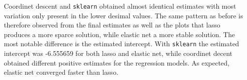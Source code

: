 \documentclass[11pt]{article}
\makeatletter
\newcommand{\boxspacing}{\kern\kvtcb@left@rule\kern\kvtcb@boxsep}
\newcommand{\prompt}[4]{
        {\ttfamily\llap{{\color{#2}[#3]:\hspace{3pt}#4}}\vspace{-\baselineskip}}
    }
\makeatother
\begin{document}
    Coordinet descent and \texttt{sklearn} obtained almost identical
estimates with most variation only present in the lower desimal values.
The same pattern as before is therefore observed from the final
estimates as well as the plots that lasso produces a more sparce
solution, while elastic net a more stable solution. The most notable
difference is the estimated intercept. With \texttt{sklearn} the
estimated intercept was -6.555659 for both lasso and elastic net, while
coordinet decent obtained different positive estimates for the
regression models. As expected, elastic net converged faster than lasso.

    \begin{tcolorbox}[breakable, size=fbox, boxrule=1pt, pad at break*=1mm,colback=cellbackground, colframe=cellborder]
\prompt{In}{incolor}{ }{\boxspacing}
\begin{Verbatim}[commandchars=\\\{\}]

\end{Verbatim}
\end{tcolorbox}


    
    
    
\end{document}
